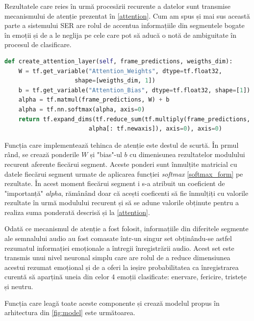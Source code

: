 \documentclass[a4paper,12pt]{book}
\begin{document}
		Rezultatele care reies în urmă procesării recurente a datelor sunt transmise mecanismului de atenție prezentat în \ref{attention}. Cum am spus și mai sus această parte a sistemului SER are rolul de accentua informațiile din segmentele bogate în emoții și de a le neglija pe cele care pot să aducă o notă de ambiguitate în procesul de clasificare. \par
		
		\begin{lstlisting}[language=Python, caption={Metoda care implementeaza mecanismul de atentie, \ref{attention}.}]	
def create_attention_layer(self, frame_predictions, weigths_dim):
	W = tf.get_variable("Attention_Weights", dtype=tf.float32, 
					shape=[weigths_dim, 1])
	b = tf.get_variable("Attention_Bias", dtype=tf.float32, shape=[1])	
	alpha = tf.matmul(frame_predictions, W) + b
	alpha = tf.nn.softmax(alpha, axis=0)
	return tf.expand_dims(tf.reduce_sum(tf.multiply(frame_predictions, 
						alpha[: tf.newaxis]), axis=0), axis=0)		\end{lstlisting}		
		Funcția care implementează tehinca de atenție este destul de scurtă. În prmul rând, se crează ponderile $W$ și "bias"-ul $b$ cu dimenisunea rezultatelor modulului recurent aferente fiecărui segment. Aceste ponderi sunt înmulțite matricial cu datele fiecărui segment urmate de aplicarea funcției \textit{softmax} \ref{softmax_form} pe rezultate. În acest moment fiecărui segment i s-a atribuit un coeficient de "importanță" \textit{alpha}, rămânând doar că acești coeficenti să fie înmulțiți cu valorile rezultate în urmă modulului recurent și să se adune valorile obținute pentru a realiza suma ponderată descrisă și la  \ref{attention}. \par
		
		Odată ce mecanismul de atenție a fost folosit, informațiile din diferitele segmente ale semnalului audio au fost comasate într-un singur set obținându-se astfel rezumatul informației emoționale a întregii înregistrării audio. Acest set este transmis unui nivel neuronal simplu care are rolul de a reduce dimensiunea acestui rezumat emoțional și de a oferi la ieșire probabilitatea ca înregistrarea curentă să aparțină uneia din celor 4 emoții clasificate: enervare, fericire, tristețe și neutru. \par
		
		Funcția care leagă toate aceste componente și crează modelul propus în arhitectura din \ref{fig:model} este următoarea.
		
\end{document}
